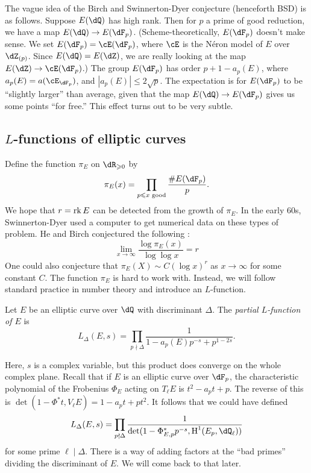 The vague idea of the Birch and Swinnerton-Dyer conjecture (henceforth BSD) is 
as follows. Suppose $E(\dQ)$ has high rank. Then for $p$ a prime of good 
reduction, we have a map $E(\dQ) \to E(\dF_p)$. (Scheme-theoretically, 
$E(\dF_p)$ doesn't make sense. We set $E(\dF_p) = \cE(\dF_p)$, where 
$\cE$ is the N\'eron model of $E$ over $\dZ_{(p)}$. Since 
$E(\dQ) = E(\dZ)$, we are really looking at the map 
$E(\dZ) \to \cE(\dF_p)$.) The group $E(\dF_p)$ has order 
$p+1-a_p(E)$, where $a_p(E) = a(\cE_{\dF_p})$, and 
$|a_p(E)|\leqslant 2\sqrt p$. The expectation is for $E(\dF_p)$ to be 
``slightly larger'' than average, given that the map 
$E(\dQ) \to E(\dF_p)$ gives us some points ``for free.'' This effect turns out 
to be very subtle. 




\subsection{\texorpdfstring{$L$}{L}-functions of elliptic curves}

Define the function $\pi_E$ on $\dR_{\geqslant 0}$ by 
\[
  \pi_E(x) = \prod_{p\leqslant x \text{ good}} \frac{\# E(\dF_p)}{p} \text{.}
\]
We hope that $r=\operatorname{rk} E$ can be detected from the growth of $\pi_E$. In the 
early 60s, Swinnerton-Dyer used a computer to get numerical data on these 
types of problem. He and Birch conjectured the following \cite[A]{bsd65}: 
\[
  \lim_{x\to \infty} \frac{\log \pi_E(x)}{\log \log x} = r
\]
One could also conjecture that $\pi_E(X) \sim C (\log x)^r$ as $x\to \infty$ 
for some constant $C$. The function $\pi_E$ is hard to work with. Instead, we 
will follow standard practice in number theory and introduce an $L$-function. 

\begin{definition}
Let $E$ be an elliptic curve over $\dQ$ with discriminant $\Delta$. The 
\emph{partial $L$-function of $E$} is 
\[
  L_\Delta(E,s) = \prod_{p\nmid \Delta} \frac{1}{1-a_p(E) p^{-s} + p^{1-2s}} \text{.}
\]
\end{definition}

Here, $s$ is a complex variable, but this product does converge on the whole 
complex plane. Recall that if $E$ is an elliptic curve over $\dF_p$, the 
characteristic polynomial of the Frobenius $\Phi_E$ acting on $T_\ell E$ is 
$t^2-a_p t + p$. The reverse of this is 
$\det(1-\Phi^\ast t,V_\ell E) = 1-a_p t + p t^2$. It follows that we could have 
defined 
\[
  L_\Delta(E,s) = \prod_{p\nmid \Delta} \frac{1}{\det(1-\Phi_{E,p}^\ast p^{-s}, \h^1(E_p,\dQ_\ell))}
\]
for some prime $\ell\mid \Delta$. There is a way of adding factors at the 
``bad primes'' dividing the discriminant of $E$. We will come back to that later. 


